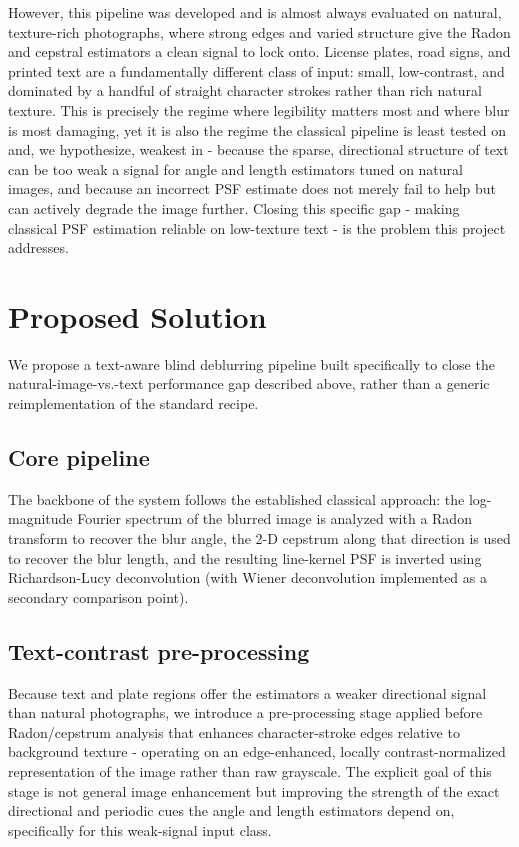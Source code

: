 \documentclass[11pt,a4paper]{article}
\begin{document}
However, this pipeline was developed and is almost always evaluated on natural,
texture-rich photographs, where strong edges and varied structure give the Radon and
cepstral estimators a clean signal to lock onto. License plates, road signs, and printed text
are a fundamentally different class of input: small, low-contrast, and dominated by a
handful of straight character strokes rather than rich natural texture. This is precisely the
regime where legibility matters most and where blur is most damaging, yet it is also the
regime the classical pipeline is least tested on and, we hypothesize, weakest in - because
the sparse, directional structure of text can be too weak a signal for angle and length
estimators tuned on natural images, and because an incorrect PSF estimate does not merely
fail to help but can actively degrade the image further. Closing this specific gap - making
classical PSF estimation reliable on low-texture text - is the problem this project addresses.

\section{Proposed Solution}

We propose a text-aware blind deblurring pipeline built specifically to close the
natural-image-vs.-text performance gap described above, rather than a generic
reimplementation of the standard recipe.

\subsection{Core pipeline}
The backbone of the system follows the established classical approach: the log-magnitude
Fourier spectrum of the blurred image is analyzed with a Radon transform to recover the
blur angle, the 2-D cepstrum along that direction is used to recover the blur length, and the
resulting line-kernel PSF is inverted using Richardson-Lucy deconvolution (with Wiener
deconvolution implemented as a secondary comparison point).

\subsection{Text-contrast pre-processing}
Because text and plate regions offer the estimators a weaker directional signal than natural
photographs, we introduce a pre-processing stage applied before Radon/cepstrum analysis
that enhances character-stroke edges relative to background texture - operating on an
edge-enhanced, locally contrast-normalized representation of the image rather than raw
grayscale. The explicit goal of this stage is not general image enhancement but improving
the strength of the exact directional and periodic cues the angle and length estimators
depend on, specifically for this weak-signal input class.
\end{document}
